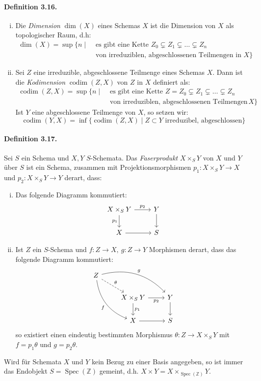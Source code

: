 \paragraph{Definition 3.16.}\label{3.16} \begin{enumerate}[(i)]
\item Die \textit{Dimension} $\dim(X)$ eines Schemas $X$ ist die Dimension von $X$ als topologischer Raum, d.h:
\begin{align*}
\dim(X)=\sup\{n\mid&\text{ es gibt eine Kette }Z_0\subsetneq Z_1\subsetneq\ldots\subsetneq Z_n\\
&\text{ von irreduziblen, abgeschlossenen Teilmengen in }X \}
\end{align*}
\item Sei $Z$ eine irreduzible, abgeschlossene Teilmenge eines Schemas $X$. Dann ist die \textit{Kodimension} $\operatorname{codim}(Z,X)$ von $Z$ in $X$ definiert als:
\begin{align*}
\operatorname{codim}(Z,X)=\sup\{n\mid & \text{ es gibt eine Kette }Z=Z_0\subsetneq Z_1\subsetneq\ldots\subsetneq Z_n\\
&\text{ von irreduziblen, abgeschlossenen Teilmengen in }X\}
\end{align*}
Ist $Y$ eine abgeschlossene Teilmenge von $X$, so setzen wir:
\[\operatorname{codim}(Y,X)=\inf \{\operatorname{codim}(Z,X)\mid Z\subset Y\text{ irreduzibel, abgeschlossen} \} \]
\end{enumerate}

\paragraph{Definition 3.17.}\label{3.17} Sei $S$ ein Schema und $X,Y$ $S$-Schemata. Das \textit{Faserprodukt} $X\times_SY$ von $X$ und $Y$ über $S$ ist ein Schema, zusammen mit Projektionsmorphismen $p_1:X\times_SY\to X$ und $p_2:X\times_SY\to Y$ derart, dass:
\begin{enumerate}[(i)]
\item Das folgende Diagramm kommutiert:
\[ \begin{tikzcd}
X\times_S Y\ar[r, "p_2"]\ar[d, "p_1"'] & Y\ar[d]\\
X\ar[r] & S
\end{tikzcd}\]
\item Ist $Z$ ein $S$-Schema und $f:Z\to X,\ g:Z\to Y$ Morphismen derart, dass das folgende Diagramm kommutiert:
\[\begin{tikzcd}
Z\ar[rrd, bend left, "g"]\ar[ddr, "f"', bend right]\ar[rd, "\theta", dashed] &&\\
&X\times_S Y\ar[r, "p_2"']\ar[d, "p_1"] & Y\ar[d]\\
&X\ar[r] & S
\end{tikzcd} \]
so existiert einen eindeutig bestimmten Morphismus $\theta:Z\to X\times_SY$ mit $f=p_1\theta$ und $g=p_2\theta$.
\end{enumerate}
Wird für Schemata $X$ und $Y$ kein Bezug zu einer Basis angegeben, so ist immer das Endobjekt $S=\operatorname{Spec}(\mathbb{Z})$ gemeint, d.h. $X\times Y=X\times_{\operatorname{Spec}(\mathbb{Z})}Y$.

